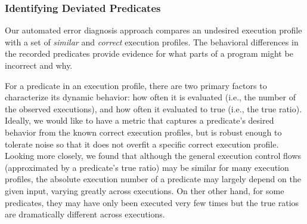 



\subsubsection{Identifying Deviated Predicates}
\label{sec:deviation}



Our
automated error diagnosis approach compares an undesired execution profile with a set
of \textit{similar} and \textit{correct} execution profiles. 
The behavioral differences in the recorded predicates provide evidence for what parts of a program might be
incorrect and why. %

For a predicate in an execution profile,
there are two primary factors to
characterize its dynamic behavior: how often it is
evaluated (i.e., the number of the
observed executions), and how often it evaluated to true (i.e., the true ratio).
Ideally, we would like to have a metric
that captures a predicate's desired behavior
from the known correct execution profiles, but is robust enough
to tolerate noise so that it does
not overfit a specific correct execution profile.
Looking more closely, we found that although
the general execution control flows (approximated by
a predicate's true ratio) may be similar for many 
execution profiles, the absolute execution
number of a predicate may largely depend on the given input, %
varying greatly across executions. On ther other hand, for
some predicates, they may have
only been executed very few times but the true ratios
are dramatically different across executions.

